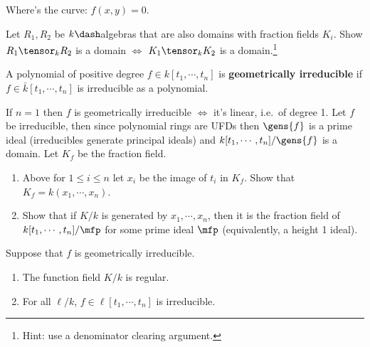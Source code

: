 Where's the curve: \(f(x, y) = 0\).

\begin{exercise}

Let \(R_1, R_2\) be \(k\dash\)algebras that are also domains with
fraction fields \(K_i\). Show \(R_1 \tensor_k R_2\) is a domain \(\iff\)
\(K_1 \tensor_k K_2\) is a domain.\footnote{Hint: use a denominator
  clearing argument.}

\end{exercise}

\begin{definition}

A polynomial of positive degree \(f\in k[t_1, \cdots, t_n]\) is
\textbf{geometrically irreducible} if \(f\in \bar k[t_1, \cdots, t_n]\)
is irreducible as a polynomial.

\end{definition}

If \(n=1\) then \(f\) is geometrically irreducible \(\iff\) it's linear,
i.e.~of degree 1. Let \(f\) be irreducible, then since polynomial rings
are UFDs then \(\gens{f}\) is a prime ideal (irreducibles generate
principal ideals) and \(k[t_1, \cdots, t_n]/\gens{f}\) is a domain. Let
\(K_f\) be the fraction field.

\begin{exercise}

\envlist

\begin{enumerate}
\def\labelenumi{\alph{enumi}.}
\item
  Above for \(1\leq i \leq n\) let \(x_i\) be the image of \(t_i\) in
  \(K_f\). Show that \(K_f = k(x_1, \cdots, x_n)\).
\item
  Show that if \(K/k\) is generated by \(x_1, \cdots, x_n\), then it is
  the fraction field of \(k[t_1, \cdots, t_n] /\mfp\) for some prime
  ideal \(\mfp\) (equivalently, a height 1 ideal).
\end{enumerate}

\end{exercise}

\begin{proposition}[?]

Suppose that \(f\) is geometrically irreducible.

\begin{enumerate}
\def\labelenumi{\alph{enumi}.}
\item
  The function field \(K/k\) is regular.
\item
  For all \(\ell/k\), \(f\in \ell[t_1, \cdots, t_n]\) is irreducible.
\end{enumerate}

\end{proposition}

